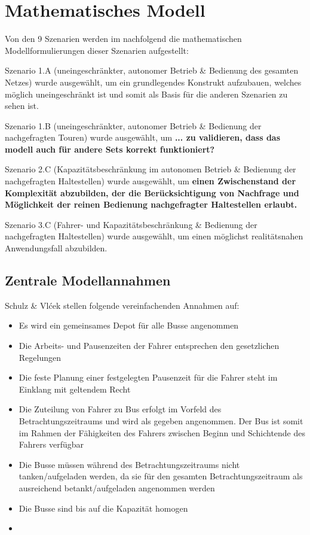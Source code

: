 \chapter{Mathematisches Modell}
\label{chapter:4}
Von den 9 Szenarien werden im nachfolgend die mathematischen Modellformulierungen dieser Szenarien aufgestellt:

Szenario 1.A (uneingeschränkter, autonomer Betrieb \& Bedienung des gesamten Netzes) wurde ausgewählt, um ein grundlegendes Konstrukt aufzubauen, welches möglich uneingeschränkt ist und somit als Basis für die anderen Szenarien zu sehen ist.

Szenario 1.B (uneingeschränkter, autonomer Betrieb \& Bedienung der nachgefragten Touren) wurde ausgewählt, um \textbf{... zu validieren, dass das modell auch für andere Sets korrekt funktioniert?}

Szenario 2.C (Kapazitätsbeschränkung im autonomen Betrieb \& Bedienung der nachgefragten Haltestellen) wurde ausgewählt, um  \textbf{einen Zwischenstand der Komplexität abzubilden, der die Berücksichtigung von Nachfrage und Möglichkeit der reinen Bedienung nachgefragter Haltestellen erlaubt.}

Szenario 3.C (Fahrer- und Kapazitätsbeschränkung \& Bedienung der nachgefragten Haltestellen) wurde ausgewählt, um einen möglichst realitätsnahen Anwendungsfall abzubilden.

\section{Zentrale Modellannahmen}
\label{sec:4.1}
Schulz \& Vlćek stellen folgende vereinfachenden Annahmen auf:
\begin{itemize}
    \item Es wird ein gemeinsames Depot für alle Busse angenommen
    \item Die Arbeits- und Pausenzeiten der Fahrer entsprechen den gesetzlichen Regelungen
    \item Die feste Planung einer festgelegten Pausenzeit für die Fahrer steht im Einklang mit geltendem Recht
    \item Die Zuteilung von Fahrer zu Bus erfolgt im Vorfeld des Betrachtungszeitraums und wird als gegeben angenommen. Der Bus ist somit im Rahmen der Fähigkeiten des Fahrers zwischen Beginn und  Schichtende des Fahrers verfügbar
    \item Die Busse müssen während des Betrachtungszeitraums nicht tanken/aufgeladen werden, da sie für den gesamten Betrachtungszeitraum als ausreichend betankt/aufgeladen angenommen werden
    \item Die Busse sind bis auf die Kapazität homogen
    \item 
\end{itemize}

